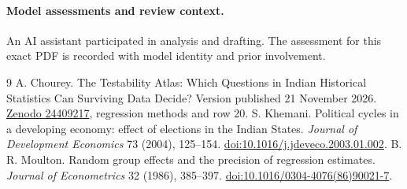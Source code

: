 \documentclass[11pt]{article}
\begin{document}
\paragraph{Model assessments and review context.} An AI assistant participated in analysis and drafting. The assessment for this exact PDF is recorded with model identity and prior involvement.

\begin{thebibliography}{9}
 A. Chourey. The Testability Atlas: Which Questions in Indian Historical Statistics Can Surviving Data Decide? Version published 21 November 2026. \href{https://doi.org/10.5281/zenodo.24409217}{Zenodo 24409217}, regression methods and row 20.
 S. Khemani. Political cycles in a developing economy: effect of elections in the Indian States. \emph{Journal of Development Economics} 73 (2004), 125--154. \href{https://doi.org/10.1016/j.jdeveco.2003.01.002}{doi:10.1016/j.jdeveco.2003.01.002}.
 B. R. Moulton. Random group effects and the precision of regression estimates. \emph{Journal of Econometrics} 32 (1986), 385--397. \href{https://doi.org/10.1016/0304-4076(86)90021-7}{doi:10.1016/0304-4076(86)90021-7}.
\end{thebibliography}
\end{document}
